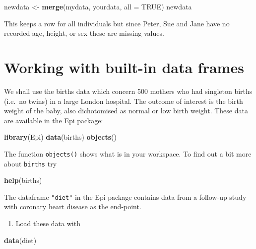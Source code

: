 \documentclass[
]{book}
\newenvironment{Shaded}{\begin{snugshade}}{\end{snugshade}}
\newcommand{\AttributeTok}[1]{\textcolor[rgb]{0.13,0.29,0.53}{#1}}
\newcommand{\ConstantTok}[1]{\textcolor[rgb]{0.56,0.35,0.01}{#1}}
\newcommand{\FunctionTok}[1]{\textcolor[rgb]{0.13,0.29,0.53}{\textbf{#1}}}
\newcommand{\NormalTok}[1]{#1}
\newcommand{\OtherTok}[1]{\textcolor[rgb]{0.56,0.35,0.01}{#1}}
\providecommand{\tightlist}{%
  \setlength{\itemsep}{0pt}\setlength{\parskip}{0pt}}
\begin{document}
\begin{Shaded}
\begin{Highlighting}[]
\NormalTok{newdata }\OtherTok{\textless{}{-}} \FunctionTok{merge}\NormalTok{(mydata, yourdata, }\AttributeTok{all =} \ConstantTok{TRUE}\NormalTok{)}
\NormalTok{newdata}
\end{Highlighting}
\end{Shaded}

This keeps a row for all individuals but since Peter, Sue and Jane
have no recorded age, height, or sex these are missing values.

\section{Working with built-in data frames}\label{working-with-built-in-data-frames}

We shall use the births data which concern 500 mothers who had
singleton births (i.e.~no twins) in a large London hospital. The
outcome of interest is the birth weight of the baby, also dichotomised
as normal or low birth weight. These data are available in the \href{https://cran.r-project.org/web/packages/Epi/index.html}{Epi}
package:

\begin{Shaded}
\begin{Highlighting}[]
\FunctionTok{library}\NormalTok{(Epi)}
\FunctionTok{data}\NormalTok{(births)}
\FunctionTok{objects}\NormalTok{()}
\end{Highlighting}
\end{Shaded}

The function \texttt{objects()} shows what is in your workspace. To
find out a bit more about \texttt{births} try

\begin{Shaded}
\begin{Highlighting}[]
\FunctionTok{help}\NormalTok{(births)}
\end{Highlighting}
\end{Shaded}

The dataframe \texttt{"diet"} in the Epi package contains data from a follow-up study with
coronary heart disease as the end-point.

\begin{enumerate}
\def\labelenumi{\arabic{enumi}.}
\tightlist
\item
  Load these data with
\end{enumerate}

\begin{Shaded}
\begin{Highlighting}[]
\FunctionTok{data}\NormalTok{(diet)}
\end{Highlighting}
\end{Shaded}
\end{document}
